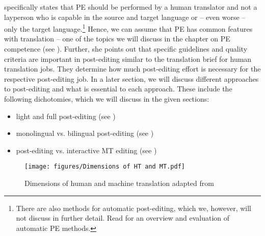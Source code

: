 \citet{obrien_towards_2011} specifically states that PE should be performed by a human translator and not a layperson who is capable in the source and target language or – even worse – only the target language.\footnote{There are also methods for automatic post-editing, which we, however, will not discuss in further detail. Read \citet{do2020review} for an overview and evaluation of automatic PE methods.} Hence, we can assume that PE has common features with translation – one of the topics we will discuss in the chapter on PE competence (see ). Further, she points out that specific guidelines and quality criteria are important in post-editing similar to the translation brief for human translation jobs. They determine how much post-editing effort is necessary for the respective post-editing job. In a later section, we will discuss different approaches to post-editing and what is essential to each approach. These include the following dichotomies, which we will discuss in the given sections: 
\begin{itemize}
    \item light and full post-editing (see )
    \item monolingual vs. bilingual post-editing (see )
    \item post-editing vs. interactive MT editing (see )
\end{itemize}


\begin{figure}[b]
\texttt{[image: figures/Dimensions of HT and MT.pdf]}
\caption{Dimensions of human and machine translation adapted from \citet[148]{hutchins1992introduction} }
\label{fig:key:2:1}
\end{figure}

